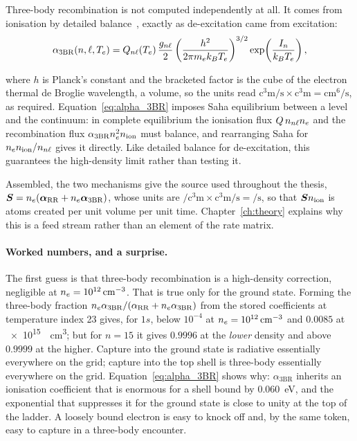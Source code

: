 Three-body recombination is not computed independently at all. It comes from
ionisation by detailed balance~\cite{Griem1997}, exactly as de-excitation came
from excitation:
\begin{equation}
  \alpha_{\mathrm{3BR}}(n,\ell,T_e)
  = Q_{n\ell}(T_e)\,\frac{g_{n\ell}}{2}
    \left(\frac{h^{2}}{2\pi m_e k_B T_e}\right)^{3/2}
    \exp\!\left(\frac{I_n}{k_BT_e}\right),
  \label{eq:alpha_3BR}
\end{equation}

\noindent where $h$ is Planck's constant and the bracketed factor is the cube of
the electron thermal de Broglie wavelength, a volume, so the units read
$\si{\cubic\centi\metre\per\second}\times\si{\cubic\centi\metre} =
\si{\centi\metre\tothe{6}\per\second}$, as required.
Equation~\eqref{eq:alpha_3BR} imposes Saha equilibrium between a level and the
continuum: in complete equilibrium the ionisation flux $Q\,n_{n\ell}n_e$ and
the recombination flux $\alpha_{\mathrm{3BR}}n_e^{2}n_{\mathrm{ion}}$ must balance, and
rearranging Saha for $n_en_{\mathrm{ion}}/n_{n\ell}$ gives it directly. Like detailed
balance for de-excitation, this guarantees the high-density limit rather than
testing it.

Assembled, the two mechanisms give the source used throughout the thesis,
$\bm{S} = n_e(\bm{\alpha}_{\mathrm{RR}} + n_e\bm{\alpha}_{\mathrm{3BR}})$,
whose units are $\si{\per\cubic\centi\metre} \times
\si{\cubic\centi\metre\per\second} = \si{\per\second}$, so that $\bm{S}n_{\mathrm{ion}}$ is
atoms created per unit volume per unit time. Chapter~\ref{ch:theory} explains
why this is a feed stream rather than an element of the rate matrix.

\paragraph{Worked numbers, and a surprise.} The first guess is that three-body
recombination is a high-density correction, negligible at
$n_e = \SI{e12}{\per\cubic\centi\metre}$. That is true only for the ground
state. Forming the three-body fraction
$n_e\alpha_{\mathrm{3BR}}/(\alpha_{\mathrm{RR}}+n_e\alpha_{\mathrm{3BR}})$
from the stored coefficients at temperature index 23 gives, for $1s$, below
$10^{-4}$ at $n_e = \SI{e12}{\per\cubic\centi\metre}$ and $0.0085$ at
\SI{e15}{\per\cubic\centi\metre}; but for $n=15$ it gives $0.9996$ at the
\emph{lower} density and above $0.9999$ at the higher. Capture into the ground
state is radiative essentially everywhere on the grid; capture into the top
shell is three-body essentially everywhere on the grid. Equation~\eqref{eq:alpha_3BR}
shows why: $\alpha_{\mathrm{3BR}}$ inherits an ionisation coefficient that is
enormous for a shell bound by \SI{0.060}{\electronvolt}, and the exponential
that suppresses it for the ground state is close to unity at the top of the
ladder. A loosely bound electron is easy to knock off and, by the same token,
easy to capture in a three-body encounter.

